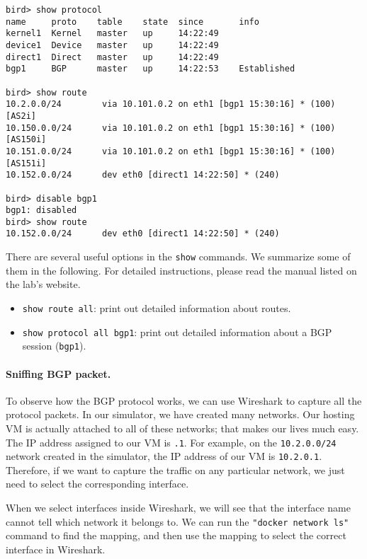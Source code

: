 \begin{lstlisting}
bird> show protocol
name     proto    table    state  since       info
kernel1  Kernel   master   up     14:22:49
device1  Device   master   up     14:22:49
direct1  Direct   master   up     14:22:49
bgp1     BGP      master   up     14:22:53    Established

bird> show route
10.2.0.0/24        via 10.101.0.2 on eth1 [bgp1 15:30:16] * (100) [AS2i]
10.150.0.0/24      via 10.101.0.2 on eth1 [bgp1 15:30:16] * (100) [AS150i]
10.151.0.0/24      via 10.101.0.2 on eth1 [bgp1 15:30:16] * (100) [AS151i]
10.152.0.0/24      dev eth0 [direct1 14:22:50] * (240)

bird> disable bgp1
bgp1: disabled
bird> show route
10.152.0.0/24      dev eth0 [direct1 14:22:50] * (240)
\end{lstlisting}
 

There are several useful options in the \texttt{show} commands. 
We summarize some of them in the following. For detailed 
instructions, please read the manual listed on the lab's website. 


\begin{itemize}[noitemsep]
\item \texttt{show route all}: print out detailed information about routes. 

\item \texttt{show protocol all bgp1}: print out detailed information 
      about a BGP session (\texttt{bgp1}). 
\end{itemize}

 
 


\paragraph{Sniffing BGP packet.}
To observe how the BGP protocol works, we can use Wireshark to
capture all the protocol packets. In our simulator, we have 
created many networks. Our hosting VM is actually attached to
all of these networks; that makes our lives much easy.  
The IP address assigned to our VM
is \texttt{.1}. For example, on the \texttt{10.2.0.0/24} network created 
in the simulator, the IP address of our VM is 
\texttt{10.2.0.1}.  Therefore, if we want to capture the 
traffic on any particular network, we just need to select 
the corresponding interface. 


When we select interfaces inside Wireshark, we will see that the 
interface name cannot tell which network it belongs to. 
We can run the \texttt{"docker network ls"} command to 
find the mapping, and then use the mapping to select the 
correct interface in Wireshark.

